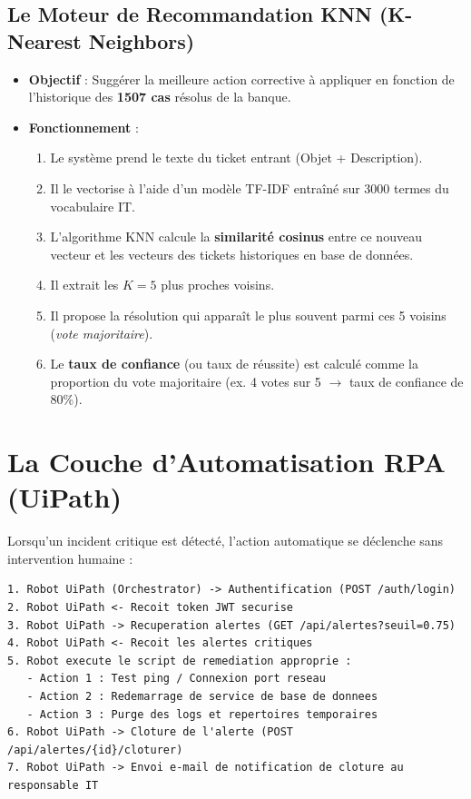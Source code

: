 \documentclass[11pt,a4paper]{article}
\begin{document}
\subsection{Le Moteur de Recommandation KNN (K-Nearest Neighbors)}
\begin{itemize}
    \item \textbf{Objectif} : Suggérer la meilleure action corrective à appliquer en fonction de l'historique des \textbf{1507 cas} résolus de la banque.
    \item \textbf{Fonctionnement} :
    \begin{enumerate}
        \item Le système prend le texte du ticket entrant (Objet + Description).
        \item Il le vectorise à l'aide d'un modèle TF-IDF entraîné sur 3000 termes du vocabulaire IT.
        \item L'algorithme KNN calcule la \textbf{similarité cosinus} entre ce nouveau vecteur et les vecteurs des tickets historiques en base de données.
        \item Il extrait les $K=5$ plus proches voisins.
        \item Il propose la résolution qui apparaît le plus souvent parmi ces 5 voisins (\textit{vote majoritaire}).
        \item Le \textbf{taux de confiance} (ou taux de réussite) est calculé comme la proportion du vote majoritaire (ex. 4 votes sur 5 $\rightarrow$ taux de confiance de 80\%).
    \end{enumerate}
\end{itemize}

\section{La Couche d'Automatisation RPA (UiPath)}

Lorsqu'un incident critique est détecté, l'action automatique se déclenche sans intervention humaine :

\begin{lstlisting}[caption={Flux d'execution RPA}]
1. Robot UiPath (Orchestrator) -> Authentification (POST /auth/login)
2. Robot UiPath <- Recoit token JWT securise
3. Robot UiPath -> Recuperation alertes (GET /api/alertes?seuil=0.75)
4. Robot UiPath <- Recoit les alertes critiques
5. Robot execute le script de remediation approprie :
   - Action 1 : Test ping / Connexion port reseau
   - Action 2 : Redemarrage de service de base de donnees
   - Action 3 : Purge des logs et repertoires temporaires
6. Robot UiPath -> Cloture de l'alerte (POST /api/alertes/{id}/cloturer)
7. Robot UiPath -> Envoi e-mail de notification de cloture au responsable IT
\end{lstlisting}
\end{document}
